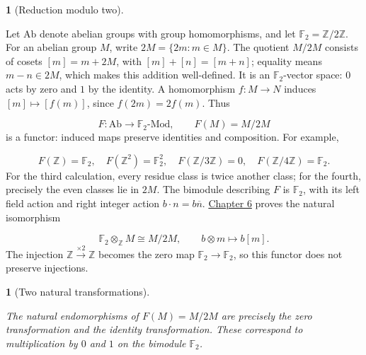 \documentclass[11pt,a4paper]{article}
\newcommand{\mathheading}{}
\theoremstyle{plain}
\newtheorem*{plainstatement}{\mathheading}
\theoremstyle{definition}
\newtheorem*{definitionstatement}{\mathheading}
\newenvironment{mathstatement}[3]{\renewcommand{\mathheading}{#1 #2}\begin{plainstatement}[#3]}{\end{plainstatement}}
\newenvironment{mathdefinition}[3]{\renewcommand{\mathheading}{#1 #2}\begin{definitionstatement}[#3]}{\end{definitionstatement}}
\begin{document}
\begin{mathdefinition}{Example}{1.2}{Reduction modulo two}
\label{env-1-2}

Let \(\mathrm{Ab}\) denote abelian groups with group homomorphisms, and let \(\mathbb F_2=\mathbb Z/2\mathbb Z\). For an abelian group \(M\), write \(2M=\{2m:m\in M\}\). The quotient \(M/2M\) consists of cosets \([m]=m+2M\), with \([m]+[n]=[m+n]\); equality means \(m-n\in2M\), which makes this addition well-defined. It is an \(\mathbb F_2\)-vector space: \(0\) acts by zero and \(1\) by the identity. A homomorphism \(f:M\to N\) induces \([m]\mapsto[f(m)]\), since \(f(2m)=2f(m)\). Thus

\[F:\mathrm{Ab}\longrightarrow\mathbb F_2\text{-}\mathrm{Mod},\qquad F(M)=M/2M\] 
is a functor: induced maps preserve identities and composition. For example,

\[F(\mathbb Z)=\mathbb F_2,\quad F(\mathbb Z^2)=\mathbb F_2^2,\quad F(\mathbb Z/3\mathbb Z)=0,\quad F(\mathbb Z/4\mathbb Z)=\mathbb F_2.\] 
For the third calculation, every residue class is twice another class; for the fourth, precisely the even classes lie in \(2M\). The bimodule describing \(F\) is \(\mathbb F_2\), with its left field action and right integer action \(b\cdot n=b\overline n\). \hyperref[chapter-06]{Chapter 6} proves the natural isomorphism

\[\mathbb F_2\otimes_{\mathbb Z}M\cong M/2M,\qquad b\otimes m\longmapsto b[m].\] 
The injection \(\mathbb Z\xrightarrow{\times2}\mathbb Z\) becomes the zero map \(\mathbb F_2\to\mathbb F_2\), so this functor does not preserve injections.


\par{}\par

\end{mathdefinition}
 
\begin{mathstatement}{Proposition}{1.3}{Two natural transformations}
\label{env-1-3}

The natural endomorphisms of \(F(M)=M/2M\) are precisely the zero transformation and the identity transformation. These correspond to multiplication by \(0\) and \(1\) on the bimodule \(\mathbb F_2\).


\par{}\par

\end{mathstatement}
 
\end{document}
